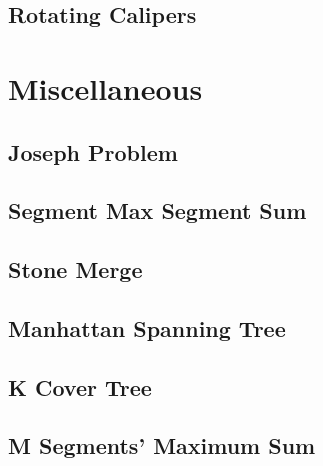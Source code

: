 \documentclass[a4paper,10pt,twocolumn,oneside]{article}
\begin{document}
\subsection{Rotating Calipers}



\section{Miscellaneous}

\subsection{Joseph Problem}


\subsection{Segment Max Segment Sum}


\subsection{Stone Merge}


\subsection{Manhattan Spanning Tree}


\subsection{K Cover Tree}


\subsection{M Segments' Maximum Sum}


%

%
\end{document}
